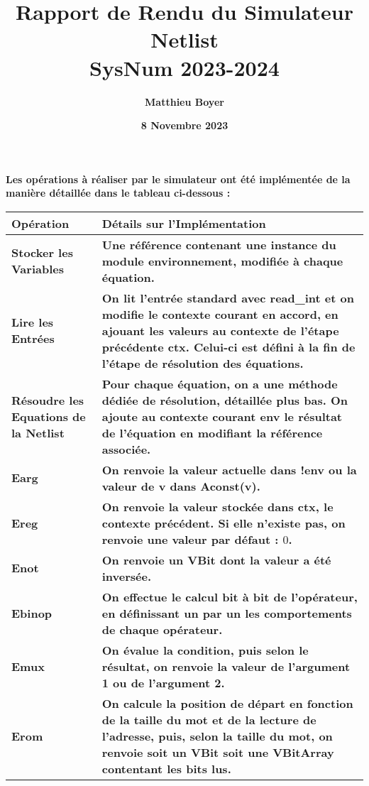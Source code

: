 \documentclass[12pt]{article}
\title{\textbf{Rapport de Rendu du Simulateur Netlist\\ \small SysNum 2023-2024}}
\author{\textbf{Matthieu Boyer}}
\date{\textbf{8 Novembre 2023}}
\begin{document}
\pagecolor{ulmv}
\color{ulmj}
\maketitle
\textbf{Les opérations à réaliser par le simulateur ont été implémentée de la manière détaillée dans le tableau ci-dessous :}\\
    \begin{longtable}{>{\bfseries\color{ulmj}}p{6cm}>{\bfseries\color{ulmj}}p{8cm}}
        \toprule
        Opération & Détails sur l'Implémentation\\
        \midrule
        Stocker les Variables & Une référence contenant une instance du module environnement, modifiée à chaque équation.
        \\
        \midrule
        Lire les Entrées & On lit l'entrée standard avec \textmd{read\_int} et on modifie le contexte courant en accord, en ajouant les valeurs au contexte de l'étape précédente \textmd{ctx}. Celui-ci est défini à la fin de l'étape de résolution des équations.
        \\
        \midrule
        Résoudre les Equations de la Netlist & Pour chaque équation, on a une méthode dédiée de résolution, détaillée plus bas. On ajoute au contexte courant \textmd{env} le résultat de l'équation en modifiant la référence associée.
        \\
        \midrule
        \textmd{Earg} & On renvoie la valeur actuelle dans \textmd{!env} ou la valeur de \textmd{v} dans \textmd{Aconst(v)}.
        \\
        \midrule
        \textmd{Ereg} & On renvoie la valeur stockée dans \textmd{ctx}, le contexte précédent. Si elle n'existe pas, on renvoie une valeur par défaut : $0$.\\
        \midrule
        \textmd{Enot} & On renvoie un \textmd{VBit} dont la valeur a été inversée.\\
        \midrule
        \textmd{Ebinop} & On effectue le calcul bit à bit de l'opérateur, en définissant un par un les comportements de chaque opérateur.\\
        \midrule
        \textmd{Emux} & On évalue la condition, puis selon le résultat, on renvoie la valeur de l'argument 1 ou de l'argument 2.\\
        \midrule
        \textmd{Erom} & On calcule la position de départ en fonction de la taille du mot et de la lecture de l'adresse, puis, selon la taille du mot, on renvoie soit un \textmd{VBit} soit une \textmd{VBitArray} contentant les bits lus.\\

\end{longtable}
\end{document}
